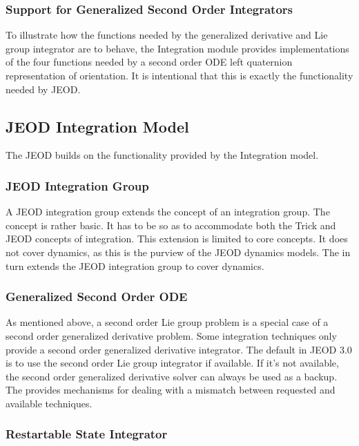 \subsubsection{Support for Generalized Second Order Integrators}

To illustrate how the functions needed by the generalized derivative and Lie
group integrator are to behave, the \erseven Integration module provides
implementations of the four functions needed by a second order ODE left quaternion
representation of orientation.
It is intentional that this is exactly the functionality needed by JEOD.

\subsection{JEOD Integration Model} \label{sec:con_des_jeod}

The JEOD \ModelDesc builds on the functionality provided by the \erseven
Integration model.

\subsubsection{JEOD Integration Group} \label{sec:con_des_jeod_integ_group}

A JEOD integration group extends the concept of an \erseven integration group.
The \erseven concept is rather basic. It has to be so as to accommodate both
the Trick and JEOD concepts of integration. This extension is limited to
core concepts. It does not cover dynamics, as this is the purview of the
JEOD dynamics models. The  in turn extends the
JEOD integration group to cover dynamics.

\subsubsection{Generalized Second Order ODE}

As mentioned above, a second order Lie group problem is a special case
of a second order generalized derivative problem. Some integration techniques
only provide a second order generalized derivative integrator. The default
in JEOD 3.0 is to use the second order Lie group integrator if available.
If it's not available, the second order generalized derivative solver can always
be used as a backup. The \ModelDesc provides mechanisms for dealing with a
mismatch between requested and available techniques.

\subsubsection{Restartable State Integrator}

